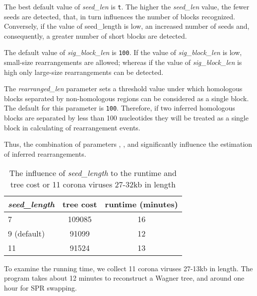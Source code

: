 The best default value of \emph{seed\_len} is \texttt{t}.
The higher the \emph{seed\_len} value, the fewer seeds are detected,
that, in turn influences the number of blocks recognized. Conversely, if the
value of seed\_length is low, an increased number of seeds and, consequently, a
greater number of short blocks are detected.

The default value of \emph{sig\_block\_len} is \texttt{100}. 
If the value of \emph{sig\_block\_len} is low, small-size rearrangements are allowed;
whereas if the value of \emph{sig\_block\_len} is high only large-size
rearrangements can be detected.

The \emph{rearranged\_len} parameter sets a threshold
value under which homologous blocks separated by non-homologous regions can be
considered as a single block. 
The default for this parameter is \texttt{100}.  Therefore, if two inferred
homologous blocks are separated by less than 100 nucleotides they will be
treated as a single block in calculating of rearrangement events.

Thus, the combination of parameters , 
, 
and  significantly influence the estimation of inferred rearrangements.

\begin{table}[t]
\caption{The influence of \emph{seed\_length} to the runtime and tree cost
or 11 corona viruses 27-32kb in length}
\label{seedLength} 
\begin{center}
\begin{tabular}{l c c}
\hline
	\emph{seed\_length} & tree cost & runtime (minutes) \\
\hline
         7             & 109085   & 16\\
         9 (default)   & 91099   & 12\\
         11            & 91524   & 13\\
\hline
\end{tabular}
\end{center}
\end{table}

To examine the running time, we collect 11 corona viruses 
27-13kb in length. The program takes about 12 minutes
to reconstruct a Wagner tree, and around one hour 
for SPR swapping.



